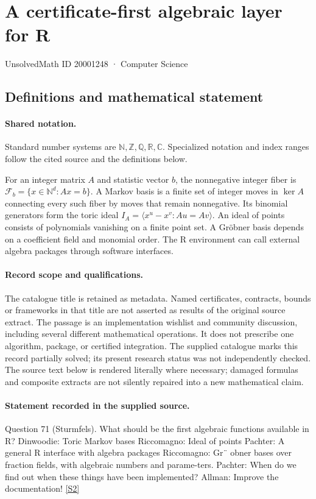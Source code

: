 \documentclass[11pt]{article}
\newcommand{\sref}[2]{\hyperlink{source:#1:#2}{[S#2]}}
\begin{document}
\setcounter{section}{20001247}
\section{A certificate-first algebraic layer for R}\label{20001248}
{\small\sffamily UnsolvedMath ID 20001248 · Computer Science}
\subsection{Definitions and mathematical statement}

\paragraph{Shared notation.}Standard number systems are $\mathbb N,\mathbb Z,\mathbb Q,\mathbb R,\mathbb C$. Specialized notation and index ranges follow the cited source and the definitions below.


For an integer matrix $A$ and statistic vector $b$, the nonnegative integer fiber is $\mathcal F_b=\{x\in\mathbb N^d:Ax=b\}$. A Markov basis is a finite set of integer moves in $\ker A$ connecting every such fiber by moves that remain nonnegative. Its binomial generators form the toric ideal $I_A=\langle x^u-x^v:Au=Av\rangle$. An ideal of points consists of polynomials vanishing on a finite point set. A Gröbner basis depends on a coefficient field and monomial order. The R environment can call external algebra packages through software interfaces.
\paragraph{Record scope and qualifications.}
The catalogue title is retained as metadata. Named certificates, contracts, bounds or frameworks in that title are not asserted as results of the original source extract.
The passage is an implementation wishlist and community discussion, including several different mathematical operations. It does not prescribe one algorithm, package, or certified integration. The supplied catalogue marks this record partially solved; its present research status was not independently checked.
The source text below is rendered literally where necessary; damaged formulas and composite extracts are not silently repaired into a new mathematical claim.
\paragraph{Statement recorded in the supplied source.}
Question 71 (Sturmfels). What should be the first algebraic functions available in R? Dinwoodie: Toric Markov bases Riccomagno: Ideal of points Pachter: A general R interface with algebra packages Riccomagno: Gr¨ obner bases over fraction fields, with algebraic numbers and parame-ters. Pachter: When do we find out when these things have been implemented? Allman: Improve the documentation! \sref{20001248}{2}
\end{document}
